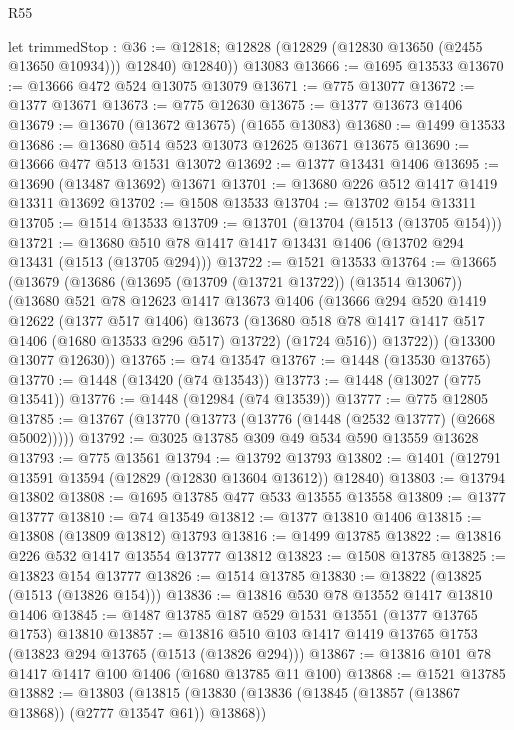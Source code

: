 \begin{lexlean}{R55}
\begin{coremodule}
{{        let trimmedStop : @36 := @12818;
        @12828 (@12829 (@12830 @13650 (@2455 @13650 @10934))) @12840)
        @12840))
    @13083
@13666 := @1695 @13533
@13670 := @13666 @472 @524 @13075 @13079
@13671 := @775 @13077
@13672 := @1377 @13671
@13673 := @775 @12630
@13675 := @1377 @13673 @1406
@13679 := @13670 (@13672 @13675) (@1655 @13083)
@13680 := @1499 @13533
@13686 := @13680 @514 @523 @13073 @12625 @13671 @13675
@13690 := @13666 @477 @513 @1531 @13072
@13692 := @1377 @13431 @1406
@13695 := @13690 (@13487 @13692) @13671
@13701 := @13680 @226 @512 @1417 @1419 @13311 @13692
@13702 := @1508 @13533
@13704 := @13702 @154 @13311
@13705 := @1514 @13533
@13709 := @13701 (@13704 (@1513 (@13705 @154)))
@13721 := @13680 @510 @78 @1417 @1417 @13431 @1406 (@13702 @294 @13431 (@1513 (@13705 @294)))
@13722 := @1521 @13533
@13764 := @13665
    (@13679
      (@13686
        (@13695 (@13709 (@13721 @13722)) (@13514 @13067))
        (@13680
          @521
          @78
          @12623
          @1417
          @13673
          @1406
          (@13666
            @294
            @520
            @1419
            @12622
            (@1377 @517 @1406)
            @13673
            (@13680 @518 @78 @1417 @1417 @517 @1406 (@1680 @13533 @296 @517) @13722)
            (@1724 @516))
          @13722))
      (@13300 @13077 @12630))
@13765 := @74 @13547
@13767 := @1448 (@13530 @13765)
@13770 := @1448 (@13420 (@74 @13543))
@13773 := @1448 (@13027 (@775 @13541))
@13776 := @1448 (@12984 (@74 @13539))
@13777 := @775 @12805
@13785 := @13767 (@13770 (@13773 (@13776 (@1448 (@2532 @13777) (@2668 @5002)))))
@13792 := @3025 @13785 @309 @49 @534 @590 @13559 @13628
@13793 := @775 @13561
@13794 := @13792 @13793
@13802 := @1401 (@12791 @13591 @13594 (@12829 (@12830 @13604 @13612)) @12840)
@13803 := @13794 @13802
@13808 := @1695 @13785 @477 @533 @13555 @13558
@13809 := @1377 @13777
@13810 := @74 @13549
@13812 := @1377 @13810 @1406
@13815 := @13808 (@13809 @13812) @13793
@13816 := @1499 @13785
@13822 := @13816 @226 @532 @1417 @13554 @13777 @13812
@13823 := @1508 @13785
@13825 := @13823 @154 @13777
@13826 := @1514 @13785
@13830 := @13822 (@13825 (@1513 (@13826 @154)))
@13836 := @13816 @530 @78 @13552 @1417 @13810 @1406
@13845 := @1487 @13785 @187 @529 @1531 @13551 (@1377 @13765 @1753) @13810
@13857 := @13816 @510 @103 @1417 @1419 @13765 @1753 (@13823 @294 @13765 (@1513 (@13826 @294)))
@13867 := @13816 @101 @78 @1417 @1417 @100 @1406 (@1680 @13785 @11 @100)
@13868 := @1521 @13785
@13882 := @13803
    (@13815
      (@13830 (@13836 (@13845 (@13857 (@13867 @13868)) (@2777 @13547 @61)) @13868))
}}
\end{coremodule}
\end{lexlean}
